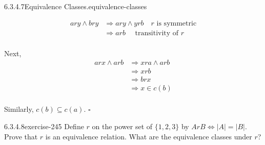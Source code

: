 \documentclass[twoside,10pt,]{book}
\numberwithin{equation}{section}
\begin{document}
\begin{divisionsolution}{6.3.4.7}{Equivalence Classes.}{equivalence-classes}
\begin{enumerate}[label=(\alph*)]
\begin{equation*}
\begin{split}
a r y \land b r y &\Rightarrow  a r y \land y r b \quad r\textrm{  is symmetric}\\
&\Rightarrow  a r b  \quad \textrm{ transitivity of }r \\
\end{split}
\end{equation*}
%
\par
\hypertarget{p-2090}{}%
Next,%
\begin{equation*}
\begin{split}
a r x \land a r b &\Rightarrow x r a \land a r b\\
&\Rightarrow  x r b\\
&\Rightarrow  b r x\\
& \Rightarrow  x \in c(b)\\
\end{split}
\end{equation*}
%
\par
\hypertarget{p-2091}{}%
Similarly, \(c(b)\subseteq c(a)\).  \(\square\)%
\end{enumerate}
%
\end{divisionsolution}%
\begin{divisionsolution}{6.3.4.8}{}{exercise-245}%
\hypertarget{p-2092}{}%
Define \(r\) on the power set of \(\{1, 2, 3\}\) by \(A r B \Leftrightarrow  \lvert A \rvert = \lvert B \rvert \). Prove that \(r\) is an equivalence relation. What are the equivalence classes under \(r\)?%
\end{divisionsolution}%
\end{document}
